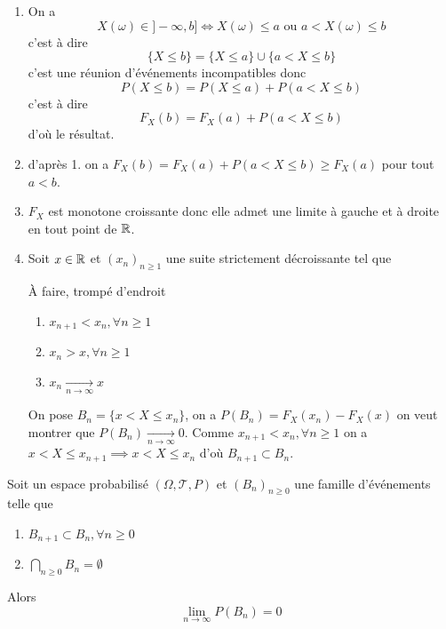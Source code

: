 \documentclass[a4paper, 12pt]{article}
\begin{document}
\begin{demonstration}
    \begin{enumerate}
        \item On a
        $$
        X(\omega) \in ]-\infty, b] \iff X(\omega) \leq a \text{ ou } a < X(\omega) \leq b
        $$
        c'est à dire
        $$
        \{ X \leq b \} = \{ X \leq a \} \cup \{ a < X \leq b \}
        $$
        c'est une réunion d'événements incompatibles donc
        $$
        P(X \leq b) = P(X \leq a) + P(a < X \leq b)
        $$
        c'est à dire
        $$
        F_X(b) = F_X(a) + P(a < X \leq b)
        $$
        d'où le résultat.
        \item d'après 1. on a $F_X(b) = F_X(a) + P(a < X \leq b) \geq F_X(a)$ pour tout $a < b$.
        \item $F_X$ est monotone croissante donc elle admet une limite à gauche et à droite en tout point de $\mathbb{R}$.
        \item Soit $x \in \mathbb{R}$ et $(x_n)_{n \geq 1}$ une suite strictement décroissante tel que
        \begin{hotwarn}
            À faire, trompé d'endroit
        \end{hotwarn}
        \begin{enumerate}[label=\roman*.]
            \item $x_{n+1} < x_n, \forall n \geq 1$
            \item $x_n > x, \forall n \geq 1$
            \item $x_n \underset{n \to \infty}{\to} x$
        \end{enumerate}
        On pose $B_n = \{x < X \leq x_n\}$, on a $P(B_n) = F_X(x_n) - F_X(x)$
        on veut montrer que $P(B_n) \underset{n \to \infty}{\to} 0$.
        Comme $x_{n+1} < x_n, \forall n \geq 1$ on a $x < X \leq x_{n+1} \implies x < X \leq x_n$
        d'où $B_{n+1} \subset B_n$.
    \end{enumerate}
\end{demonstration}

\begin{lemme}{}{}
    Soit un espace probabilisé $(\Omega, \mathcal{T}, P)$ et $(B_n)_{n \geq 0}$ une famille d'événements telle que
    \begin{enumerate}
        \item $B_{n+1} \subset B_n, \forall n \geq 0$
        \item $\bigcap\limits_{n \geq 0} B_n = \emptyset$
    \end{enumerate}
    Alors
    $$
    \lim_{n \to \infty} P(B_n) = 0
    $$
\end{lemme}
\end{document}
